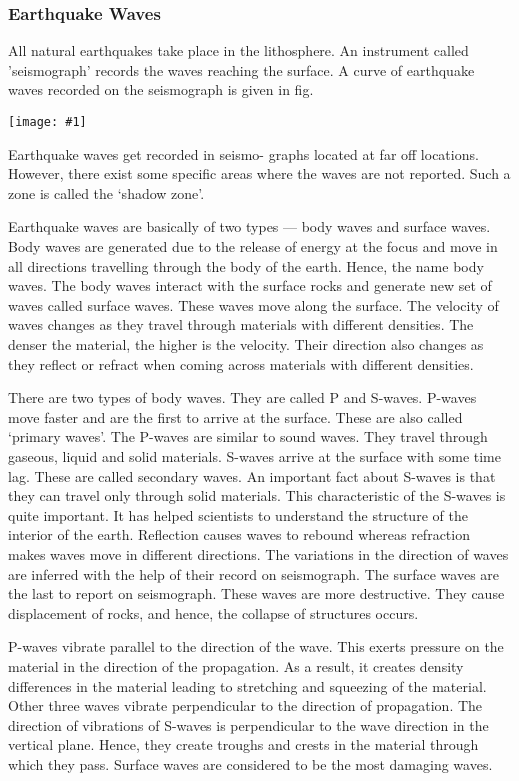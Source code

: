 \documentclass[8pt, a4paper, oneside, twocolumn]{extarticle}
\newcommand{\ph}[1]{
    \texttt{[image: \#1]}
}
\begin{document}
\subsubsection{Earthquake Waves}
All natural earthquakes take place in the lithosphere. An instrument called 'seismograph' records the waves reaching the surface. A curve of earthquake waves recorded on the seismograph is given in fig.

\ph{equakew}

Earthquake waves get recorded in seismo-
graphs located at far off locations. However,
there exist some specific areas where the waves
are not reported. Such a zone is called the
‘shadow zone’.


Earthquake waves are basically of two types — body waves and surface waves. Body waves are generated due to the release of energy at the focus and move in all directions travelling through the body of the earth. Hence, the name body waves. The body waves interact with the surface rocks and generate new set of waves called surface waves. These waves move along the surface. The velocity of waves changes as they travel through materials with different densities. The denser the material, the higher is the velocity. Their direction also changes as they reflect or refract when coming across materials with different densities.

There are two types of body waves. They are called P and S-waves. P-waves move faster and are the first to arrive at the surface. These are also called ‘primary waves’. The P-waves are similar to sound waves. They travel through gaseous, liquid and solid materials. S-waves arrive at the surface with some time lag. These are called secondary waves. An important fact about S-waves is that they can travel only through solid materials. This characteristic of the S-waves is quite important. It has helped scientists to understand the structure of the interior of the earth. Reflection causes waves to rebound whereas refraction makes waves move in different directions. The variations in the direction of waves are inferred with the help of their record on seismograph. The surface waves are the last to report on seismograph. These waves are more destructive. They cause displacement of rocks, and hence, the collapse of structures occurs.

P-waves vibrate parallel to the direction of the wave. This exerts pressure on the material in the direction of the propagation. As a result, it creates density differences in the material leading to stretching and squeezing of the material. Other three waves vibrate perpendicular to the direction of propagation. The direction of vibrations of S-waves is perpendicular to the wave direction in the vertical plane. Hence, they create troughs and crests in the material through which they pass. Surface waves are considered to be the most damaging waves.
\end{document}
